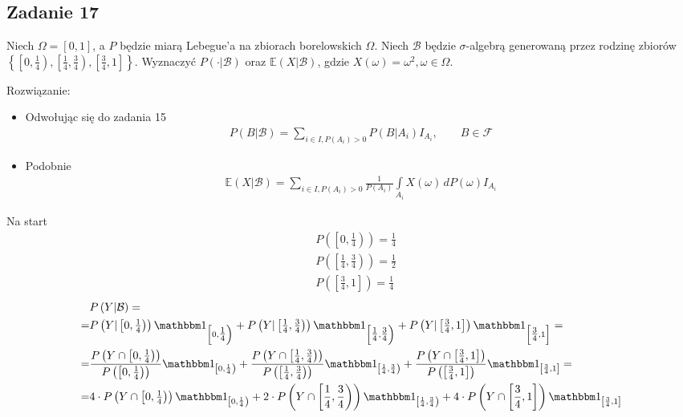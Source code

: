 \subsection*{Zadanie 17}
Niech $ \Omega=[0,1] $, a $ P $ będzie miarą Lebegue'a na zbiorach borelowskich $ \Omega $. Niech $ \mathcal B $ będzie $ \sigma $-algebrą generowaną przez rodzinę zbiorów $ \left\{\left[0,\frac{1}{4}\right),\left[\frac{1}{4},\frac{3}{4}\right),\left[\frac{3}{4},1\right]\right\} $. Wyznaczyć $ P\left(\cdot|\mathcal B\right) $ oraz $ \mathbb E \left(X|\mathcal B\right) $, gdzie $ X(\omega)=\omega^2,\omega\in\Omega $.

Rozwiązanie:
\begin{itemize}
\item Odwołując się do zadania 15
\begin{gather*}
P\left(B|\mathcal B\right)=\sum_{i\in I,P\left(A_i\right)>0}P\left(B|A_i\right)I_{A_i},\qquad B\in \mathcal F 
\end{gather*}
\item Podobnie
\begin{gather*}
\mathbb E \left(X|\mathcal B\right)=\sum_{i\in I,P\left(A_i\right)>0}\frac{1}{P\left(A_i\right)}\int\limits_{A_i}X(\omega)\,dP(\omega)I_{A_i}
\end{gather*}
\end{itemize}
Na start
\begin{align*}
&P\left(\left[0,\tfrac{1}{4}\right)\right)=\frac{1}{4}\\
&P\left(\left[\tfrac{1}{4},\tfrac{3}{4}\right)\right)=\frac{1}{2}\\
&P\left(\left[\tfrac{3}{4},1\right]\right)=\frac{1}{4}
\end{align*}
\begin{align*}
&P\left(Y|\mathcal B\right)
=\\=&
P\left(Y|\left[0,\tfrac{1}{4}\right)\right)
\mathbbm1_{\left[0,\tfrac{1}{4}\right)}+
P\left(Y|\left[\tfrac{1}{4},\tfrac{3}{4}\right)\right)
\mathbbm1_{\left[\tfrac{1}{4},\tfrac{3}{4}\right)}+
P\left(Y|\left[\tfrac{3}{4},1\right]\right)
\mathbbm1_{\left[\tfrac{3}{4},1\right]}
=\\=&
\frac{P\left(Y\cap \left[0,\tfrac{1}{4}\right)\right)}{P\left(\left[0,\tfrac{1}{4}\right)\right)}
\mathbbm1_{\left[0,\frac{1}{4}\right)}+
\frac{P\left(Y\cap \left[\tfrac{1}{4},\tfrac{3}{4}\right)\right)}{P\left(\left[\tfrac{1}{4},\tfrac{3}{4}\right)\right)}
\mathbbm1_{\left[\frac{1}{4},\frac{3}{4}\right)}+
\frac{P\left(Y\cap \left[\tfrac{3}{4},1\right]\right)}{P\left(\left[\tfrac{3}{4},1\right]\right)}
\mathbbm1_{\left[\frac{3}{4},1\right]}
=\\=&
4\cdot P\left(Y\cap \left[0,\tfrac{1}{4}\right)\right)
\mathbbm1_{\left[0,\frac{1}{4}\right)}+
2\cdot P\left(Y\cap \left[\frac{1}{4},\frac{3}{4}\right)\right)
\mathbbm1_{\left[\frac{1}{4},\frac{3}{4}\right)}+
4\cdot P\left(Y\cap \left[\frac{3}{4},1\right]\right)
\mathbbm1_{\left[\frac{3}{4},1\right]}
\end{align*}
